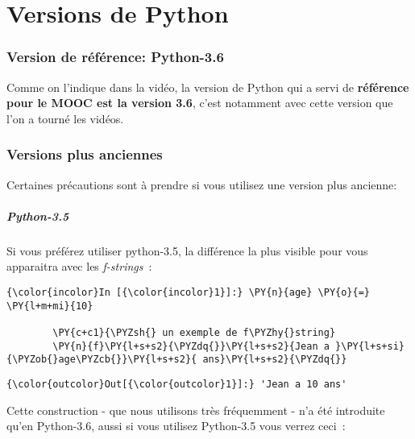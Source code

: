    \hypertarget{versions-de-python}{%
\section{Versions de Python}\label{versions-de-python}}

    \hypertarget{version-de-ruxe9fuxe9rence-python-3.6}{%
\subsubsection{Version de référence:
Python-3.6}\label{version-de-ruxe9fuxe9rence-python-3.6}}

    Comme on l'indique dans la vidéo, la version de Python qui a servi de
\textbf{référence pour le MOOC est la version 3.6}, c'est notamment avec
cette version que l'on a tourné les vidéos.

    \hypertarget{versions-plus-anciennes}{%
\subsubsection{Versions plus anciennes}\label{versions-plus-anciennes}}

    Certaines précautions sont à prendre si vous utilisez une version plus
ancienne:

    \hypertarget{python-3.5}{%
\subparagraph{Python-3.5}\label{python-3.5}}

    Si vous préférez utiliser python-3.5, la différence la plus visible pour
vous apparaitra avec les \emph{f-strings}~:

    \begin{Verbatim}[commandchars=\\\{\}]
{\color{incolor}In [{\color{incolor}1}]:} \PY{n}{age} \PY{o}{=} \PY{l+m+mi}{10}
        
        \PY{c+c1}{\PYZsh{} un exemple de f\PYZhy{}string}
        \PY{n}{f}\PY{l+s+s2}{\PYZdq{}}\PY{l+s+s2}{Jean a }\PY{l+s+si}{\PYZob{}age\PYZcb{}}\PY{l+s+s2}{ ans}\PY{l+s+s2}{\PYZdq{}}
\end{Verbatim}


\begin{Verbatim}[commandchars=\\\{\}]
{\color{outcolor}Out[{\color{outcolor}1}]:} 'Jean a 10 ans'
\end{Verbatim}
            
    Cette construction - que nous utilisons très fréquemment - n'a été
introduite qu'en Python-3.6, aussi si vous utilisez Python-3.5 vous
verrez ceci~:

